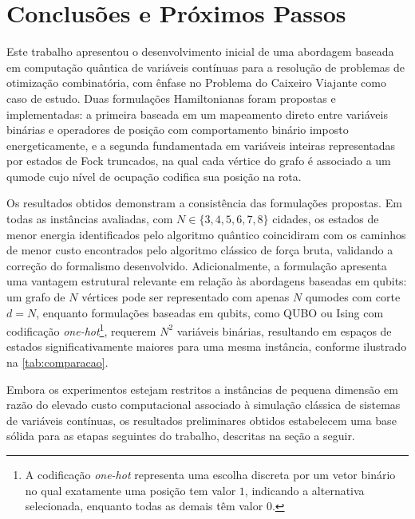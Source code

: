\chapter{Conclusões e Próximos Passos}\label{cap:conclusao}


Este trabalho apresentou o desenvolvimento inicial de uma abordagem baseada em computação quântica de variáveis contínuas para a resolução de problemas de otimização combinatória, com ênfase no Problema do Caixeiro Viajante como caso de estudo. Duas formulações Hamiltonianas foram propostas e implementadas: a primeira baseada em um mapeamento direto entre variáveis binárias e operadores de posição com comportamento binário imposto energeticamente, e a segunda fundamentada em variáveis inteiras representadas por estados de Fock truncados, na qual cada vértice do grafo é associado a um qumode cujo nível de ocupação codifica sua posição na rota.

Os resultados obtidos demonstram a consistência das formulações propostas. Em todas as instâncias avaliadas, com $N \in \{3, 4, 5, 6, 7, 8\}$ cidades, os estados de menor energia identificados pelo algoritmo quântico coincidiram com os caminhos de menor custo encontrados pelo algoritmo clássico de força bruta, validando a correção do formalismo desenvolvido. Adicionalmente, a formulação apresenta uma vantagem estrutural relevante em relação às abordagens baseadas em qubits: um grafo de $N$ vértices pode ser representado com apenas $N$ qumodes com corte $d = N$, enquanto formulações baseadas em qubits, como QUBO ou Ising com codificação \textit{one-hot}\footnote{A codificação \textit{one-hot} representa uma escolha discreta por um vetor binário no qual exatamente uma posição tem valor $1$, indicando a alternativa selecionada, enquanto todas as demais têm valor $0$.}, requerem $N^2$ variáveis binárias, resultando em espaços de estados significativamente maiores para uma mesma instância, conforme ilustrado na \autoref{tab:comparacao}.

Embora os experimentos estejam restritos a instâncias de pequena dimensão em razão do elevado custo computacional associado à simulação clássica de sistemas de variáveis contínuas, os resultados preliminares obtidos estabelecem uma base sólida para as etapas seguintes do trabalho, descritas na seção a seguir.

